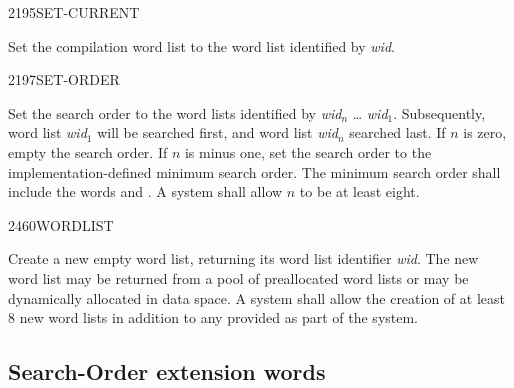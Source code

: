\begin{newword}{2195}{SET-CURRENT}

	Set the compilation word list to the word list identified by
	\emph{wid}.
\end{newword}


\begin{newword}{2197}{SET-ORDER}

	Set the search order to the word lists identified by
	\emph{wid}$_n$ {\ldots} \emph{wid}$_1$. Subsequently, word list
	\emph{wid}$_1$ will be searched first, and word list
	\emph{wid}$_n$ searched last. If $n$ is zero, empty the search
	order. If $n$ is minus one, set the search order to the
	implementation-defined minimum search order. The minimum search
	order shall include the words  and
	. A system shall allow $n$ to be at least eight.
\end{newword}


\begin{newword}{2460}{WORDLIST}

	Create a new empty word list, returning its word list identifier
	\emph{wid}. The new word list may be returned from a pool of
	preallocated word lists or may be dynamically allocated in data
	space. A system shall allow the creation of at least 8 new word
	lists in addition to any provided as part of the system.
\end{newword}


\subsection{Search-Order extension words} %
\extended

